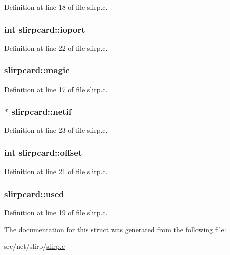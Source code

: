 Definition at line 18 of file slirp.\+c.

\hypertarget{structslirpcard_aed1b09924afb61043cd93bed7edea389}{
\subsubsection[{ioport}]{\setlength{\rightskip}{0pt plus 5cm}int slirpcard\+::ioport}}\label{structslirpcard_aed1b09924afb61043cd93bed7edea389}


Definition at line 22 of file slirp.\+c.

\hypertarget{structslirpcard_ab77a4a7b33ab2cd4a821aff9445cd134}{
\subsubsection[{magic}]{ slirpcard\+::magic}}\label{structslirpcard_ab77a4a7b33ab2cd4a821aff9445cd134}


Definition at line 17 of file slirp.\+c.

\hypertarget{structslirpcard_a4c84f5911831326cc979fe1c96c8607b}{
\subsubsection[{netif}]{$\ast$ slirpcard\+::netif}}\label{structslirpcard_a4c84f5911831326cc979fe1c96c8607b}


Definition at line 23 of file slirp.\+c.

\hypertarget{structslirpcard_adda6ed53672da7a5e56fd16007d704d0}{
\subsubsection[{offset}]{\setlength{\rightskip}{0pt plus 5cm}int slirpcard\+::offset}}\label{structslirpcard_adda6ed53672da7a5e56fd16007d704d0}


Definition at line 21 of file slirp.\+c.

\hypertarget{structslirpcard_aca0b3836ef213a9ab9cab689175d6a38}{
\subsubsection[{used}]{ slirpcard\+::used}}\label{structslirpcard_aca0b3836ef213a9ab9cab689175d6a38}


Definition at line 19 of file slirp.\+c.



The documentation for this struct was generated from the following file\+:\begin{DoxyCompactItemize}
\item 
src/net/slirp/\hyperlink{slirp_8c}{slirp.\+c}\end{DoxyCompactItemize}
